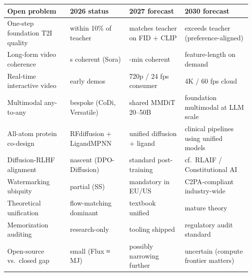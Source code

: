 {\def\LTcaptype{none} %
\begin{longtable}[]{@{}
  >{\raggedright\arraybackslash}p{}
  >{\raggedright\arraybackslash}p{}
  >{\raggedright\arraybackslash}p{}
  >{\raggedright\arraybackslash}p{}@{}}
\toprule\noalign{}
\begin{minipage}[b]{\linewidth}\raggedright
Open problem
\end{minipage} & \begin{minipage}[b]{\linewidth}\raggedright
2026 status
\end{minipage} & \begin{minipage}[b]{\linewidth}\raggedright
2027 forecast
\end{minipage} & \begin{minipage}[b]{\linewidth}\raggedright
2030 forecast
\end{minipage} \\
\midrule\noalign{}
\endhead
\bottomrule\noalign{}
\endlastfoot
One-step foundation T2I quality & within 10\% of teacher & matches teacher on FID + CLIP & exceeds teacher (preference-aligned) \\
Long-form video coherence & 60 s coherent (Sora) & 5-min coherent & feature-length on demand \\
Real-time interactive video & early demos & 720p / 24 fps consumer & 4K / 60 fps cloud \\
Multimodal any-to-any & bespoke (CoDi, Versatile) & shared MMDiT 20--50B & foundation multimodal at LLM scale \\
All-atom protein co-design & RFdiffusion + LigandMPNN & unified diffusion + ligand & clinical pipelines using unified models \\
Diffusion-RLHF alignment & nascent (DPO-Diffusion) & standard post-training & cf.~RLAIF / Constitutional AI \\
Watermarking ubiquity & partial (SS) & mandatory in EU/US & C2PA-compliant industry-wide \\
Theoretical unification & flow-matching dominant & textbook unified & mature theory \\
Memorization auditing & research-only & tooling shipped & regulatory audit standard \\
Open-source vs.~closed gap & small (Flux ≈ MJ) & possibly narrowing further & uncertain (compute frontier matters) \\
\end{longtable}
}

